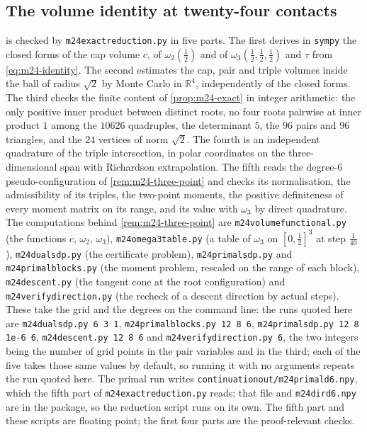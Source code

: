 \documentclass[11pt,reqno]{amsart}
\renewcommand{\_}{\origunderscore\allowbreak}
\numberwithin{equation}{section}
\theoremstyle{plain}
\theoremstyle{definition}
\theoremstyle{remark}
\begin{document}
\subsection*{The volume identity at twenty-four contacts}

 is checked by \texttt{m24\_exact\_reduction.py} in
five parts. The first derives in \texttt{sympy} the closed forms of the
cap volume $c$, of $\omega_2(\tfrac12)$ and of
$\omega_3(\tfrac12,\tfrac12,\tfrac12)$ and $\tau$ from
\eqref{eq:m24-identity}. The second estimates the cap, pair and triple
volumes inside the ball of radius $\sqrt2$ by Monte Carlo in
$\mathbb{R}^4$, independently of the closed forms. The third checks the
finite content of \cref{prop:m24-exact} in integer arithmetic: the only
positive inner product between distinct roots, no four roots pairwise at
inner product $1$ among the $10626$ quadruples, the determinant $5$, the
$96$ pairs and $96$ triangles, and the $24$ vertices of norm $\sqrt2$. The
fourth is an independent quadrature of the triple intersection, in
polar coordinates on the three-dimensional span with Richardson
extrapolation. The fifth reads the degree-$6$ pseudo-configuration of
\cref{rem:m24-three-point} and checks its normalisation, the admissibility
of its triples, the two-point moments, the positive definiteness of every
moment matrix on its range, and its value with $\omega_3$ by direct
quadrature. The computations behind \cref{rem:m24-three-point} are
\texttt{m24\_volume\_functional.py} (the functions $c$, $\omega_2$,
$\omega_3$), \texttt{m24\_omega3\_table.py} (a table of $\omega_3$ on
$[0,\tfrac12]^3$ at step $\tfrac1{40}$),
\texttt{m24\_dual\_sdp.py} (the certificate problem),
\texttt{m24\_primal\_sdp.py} and \texttt{m24\_primal\_blocks.py} (the
moment problem, rescaled on the range of each block),
\texttt{m24\_descent.py} (the tangent cone at the root configuration) and
\texttt{m24\_verify\_direction.py} (the recheck of a descent direction by
actual steps). These take the grid and the degrees on the command
line: the runs quoted here are \texttt{m24\_dual\_sdp.py 6 3 1},
\texttt{m24\_primal\_blocks.py 12 8 6}, \texttt{m24\_primal\_sdp.py 12 8
1e-6 6}, \texttt{m24\_descent.py 12 8 6} and
\texttt{m24\_verify\_direction.py 6}, the two integers being the number of
grid points in the pair variables and in the third; each of the five takes
those same values by default, so running it with no arguments repeats the
run quoted here. The primal run writes
\texttt{continuation\_out/m24\_primal\_d6.npy}, which the fifth part of
\texttt{m24\_exact\_reduction.py} reads; that file and
\texttt{m24\_dir\_d6.npy} are in the package, so the reduction script runs
on its own. The fifth part and these scripts are floating point; the
first four parts are the proof-relevant checks.
\end{document}

